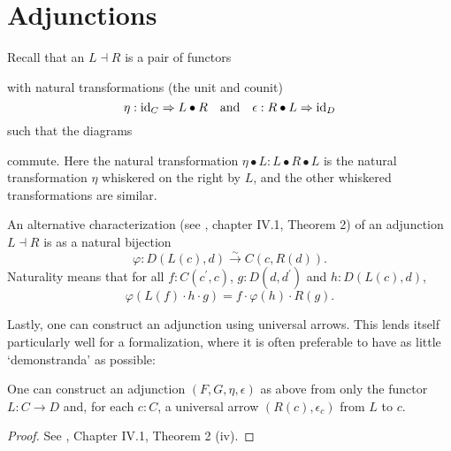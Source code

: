 \section{Adjunctions}

Recall that an  $ L \dashv R $ is a pair of functors
\begin{center}
\end{center}
with natural transformations (the unit and counit)
\[ \eta: \text{id}_{C} \Rightarrow L \bullet R \quad \text{and} \quad \epsilon: R \bullet L \Rightarrow \text{id}_{D} \]
such that the diagrams
\begin{center}
  \qquad
\end{center}
commute. Here the natural transformation $ \eta \bullet L: L \bullet R \bullet L $ is the natural transformation $ \eta $ whiskered on the right by $ L $, and the other whiskered transformations are similar.

An alternative characterization (see \cite{MacLane}, chapter IV.1, Theorem 2) of an adjunction $ L \dashv R $ is as a natural bijection
\[ \varphi: D(L(c), d) \xrightarrow{\sim} C(c, R(d)). \]
Naturality means that for all $ f: C(c^\prime, c) $, $ g: D(d, d^\prime) $ and $ h: D(L(c), d) $,
\[ \varphi(L(f) \cdot h \cdot g) = f \cdot \varphi(h) \cdot R(g). \]

Lastly, one can construct an adjunction using universal arrows. This lends itself particularly well for a formalization, where it is often preferable to have as little `demonstranda' as possible:
\begin{lemma}
  One can construct an adjunction $ (F, G, \eta, \epsilon) $ as above from only the functor $ L: C \to D $ and, for each $ c: C $, a universal arrow $ (R(c), \epsilon_c) $ from $ L $ to $ c $.
\end{lemma}
\begin{proof}
  See \cite{MacLane}, Chapter IV.1, Theorem 2 (iv).
\end{proof}

